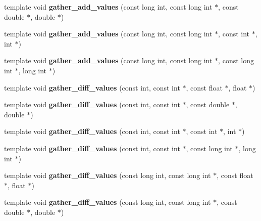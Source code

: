 \begin{DoxyCompactItemize}
\item 
\mbox{\label{namespaceschwz_a779e1ca076ad997ce50d54ecdef0a3fb}} 
template void {\bfseries gather\+\_\+add\+\_\+values} (const long int, const long int $\ast$, const double $\ast$, double $\ast$)
\item 
\mbox{\label{namespaceschwz_a29acf621d2dc1e5fcf181c9daed0ad6c}} 
template void {\bfseries gather\+\_\+add\+\_\+values} (const long int, const long int $\ast$, const int $\ast$, int $\ast$)
\item 
\mbox{\label{namespaceschwz_ac5b57e7bd1e1def39a59ebd97fdfbfb2}} 
template void {\bfseries gather\+\_\+add\+\_\+values} (const long int, const long int $\ast$, const long int $\ast$, long int $\ast$)
\item 
\mbox{\label{namespaceschwz_afbede3c73f67fb283f62517b71f93fe1}} 
template void {\bfseries gather\+\_\+diff\+\_\+values} (const int, const int $\ast$, const float $\ast$, float $\ast$)
\item 
\mbox{\label{namespaceschwz_af0bde8e5792d69e70e61eb8722f1b283}} 
template void {\bfseries gather\+\_\+diff\+\_\+values} (const int, const int $\ast$, const double $\ast$, double $\ast$)
\item 
\mbox{\label{namespaceschwz_af4c83d3aff6a056dc2e2da6397245c24}} 
template void {\bfseries gather\+\_\+diff\+\_\+values} (const int, const int $\ast$, const int $\ast$, int $\ast$)
\item 
\mbox{\label{namespaceschwz_a00aa4cb20044923725a71a96d1bd812c}} 
template void {\bfseries gather\+\_\+diff\+\_\+values} (const int, const int $\ast$, const long int $\ast$, long int $\ast$)
\item 
\mbox{\label{namespaceschwz_a76b4f4cf99358eb91f85f1a41f72cb1c}} 
template void {\bfseries gather\+\_\+diff\+\_\+values} (const long int, const long int $\ast$, const float $\ast$, float $\ast$)
\item 
\mbox{\label{namespaceschwz_a8a6322efe1ef6c5acda8d5673241ce55}} 
template void {\bfseries gather\+\_\+diff\+\_\+values} (const long int, const long int $\ast$, const double $\ast$, double $\ast$)

\end{DoxyCompactItemize}
